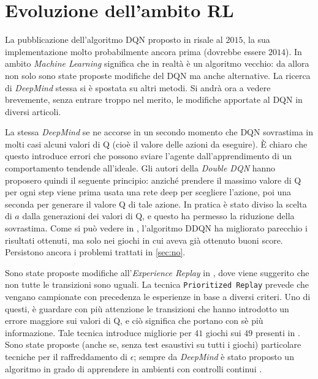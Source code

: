 \documentclass[twoside,twocolumn,10pt]{extarticle}
\theoremstyle{definition}
\begin{document}
\section{Evoluzione dell'ambito RL}\label{sec:evoalg}
	La pubblicazione dell'algoritmo DQN proposto in \cite{bib:dqn} risale al $2015$, la sua implementazione molto probabilmente ancora prima (dovrebbe essere $2014$). In ambito \textit{Machine Learning} significa che in realtà è un algoritmo vecchio: da allora non solo sono state proposte modifiche del DQN ma anche alternative. La ricerca di \textit{DeepMind} stessa si è spostata su altri metodi.	Si andrà ora a vedere brevemente, senza entrare troppo nel merito, le modifiche apportate al DQN in diversi articoli.
	
	La stessa \textit{DeepMind} se ne accorse in un secondo momento che DQN sovrastima in molti casi alcuni valori di Q (cioè il valore delle azioni da eseguire). È chiaro che questo introduce errori che possono sviare l'agente dall'apprendimento di un comportamento tendende all'ideale. Gli autori della \textit{Double DQN} \cite{bib:ddqn} hanno proposero quindi il seguente principio: anziché prendere il massimo valore di Q per ogni step viene prima usata una rete deep per scegliere l'azione, poi una seconda per generare il valore Q di tale azione. In pratica è stato diviso la scelta di $a$ dalla generazioni dei valori di Q, e questo ha permesso la riduzione della sovrastima. Come si può vedere in \cite{bib:ddqn}, l'algoritmo DDQN ha migliorato parecchio i risultati ottenuti, ma solo nei giochi in cui aveva già ottenuto buoni score. Persistono ancora i problemi trattati in \ref{sec:no}. 
	
	Sono state proposte modifiche all'\textit{Experience Replay} in \cite{bib:per}, dove viene suggerito che non tutte le transizioni sono uguali. La tecnica \texttt{Prioritized Replay} prevede che vengano campionate con precedenza le esperienze in base a diversi criteri. Uno di questi, è guardare con più attenzione le transizioni che hanno introdotto un errore maggiore sui valori di Q, e ciò significa che portano con sè più informazione. Tale tecnica introduce migliorie per $41$ giochi sui $49$ presenti in \cite{bib:dqn}. Sono state proposte (anche se, senza test esaustivi su tutti i giochi) particolare tecniche per il raffreddamento di $\epsilon$; sempre da \textit{DeepMind} è stato proposto un algoritmo in grado di apprendere in ambienti con controlli continui \cite{bib:con}.
\end{document}
